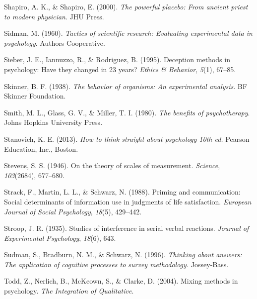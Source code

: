 \documentclass[
]{krantz}
\newlength{\cslhangindent}
\newlength{\cslentryspacingunit} %
\newenvironment{CSLReferences}[2] %
 {%
  \setlength{\parindent}{0pt}
  \ifodd #1
  \let\oldpar\par
  \def\par{\hangindent=\cslhangindent\oldpar}
  \fi
  \setlength{\parskip}{#2\cslentryspacingunit}
 }%
 {}
\begin{document}
\begin{CSLReferences}{1}{0}
\leavevmode{}%
Shapiro, A. K., \& Shapiro, E. (2000). \emph{The powerful placebo: From ancient priest to modern physician}. JHU Press.

\leavevmode{}%
Sidman, M. (1960). \emph{Tactics of scientific research: Evaluating experimental data in psychology}. Authors Cooperative.

\leavevmode{}%
Sieber, J. E., Iannuzzo, R., \& Rodriguez, B. (1995). Deception methods in psychology: Have they changed in 23 years? \emph{Ethics \& Behavior}, \emph{5}(1), 67--85.

\leavevmode{}%
Skinner, B. F. (1938). \emph{The behavior of organisms: An experimental analysis}. BF Skinner Foundation.

\leavevmode{}%
Smith, M. L., Glass, G. V., \& Miller, T. I. (1980). \emph{The benefits of psychotherapy}. Johns Hopkins University Press.

\leavevmode{}%
Stanovich, K. E. (2013). \emph{How to think straight about psychology 10th ed.} Pearson Education, Inc., Boston.

\leavevmode{}%
Stevens, S. S. (1946). On the theory of scales of measurement. \emph{Science}, \emph{103}(2684), 677--680.

\leavevmode{}%
Strack, F., Martin, L. L., \& Schwarz, N. (1988). Priming and communication: Social determinants of information use in judgments of life satisfaction. \emph{European Journal of Social Psychology}, \emph{18}(5), 429--442.

\leavevmode{}%
Stroop, J. R. (1935). Studies of interference in serial verbal reactions. \emph{Journal of Experimental Psychology}, \emph{18}(6), 643.

\leavevmode{}%
Sudman, S., Bradburn, N. M., \& Schwarz, N. (1996). \emph{Thinking about answers: The application of cognitive processes to survey methodology.} Jossey-Bass.

\leavevmode{}%
Todd, Z., Nerlich, B., McKeown, S., \& Clarke, D. (2004). Mixing methods in psychology. \emph{The Integration of Qualitative}.


\end{CSLReferences}
\end{document}
